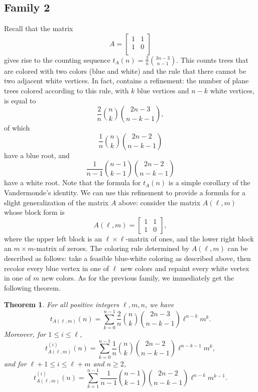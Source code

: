 \documentclass[12pt]{amsart}
\newtheorem{theorem}{Theorem}
\begin{document}
\subsection{Family 2}\label{sec:fam3}

Recall that the matrix
$$A = \begin{bmatrix}
    1 & 1 \\
    1 & 0 \\    
\end{bmatrix}$$
gives rise to the counting sequence $t_A(n) = \frac{2}{n} \binom{3n-3}{n-1}$. This counts trees that are colored with two colors (blue and white) and the rule that there cannot be two adjacent white vertices. In fact, \cite{KPT1986Fibonacci} contains a refinement: the number of plane trees colored according to this rule, with $k$ blue vertices and $n-k$ white vertices, is equal to
$$\frac{2}{n} \binom{n}{k} \binom{2n-3}{n-k-1},$$
of which
$$\frac{1}{n} \binom{n}{k} \binom{2n-2}{n-k-1}$$
have a blue root, and
$$\frac{1}{n-1} \binom{n-1}{k-1} \binom{2n-2}{n-k-1}$$
have a white root. Note that the formula for $t_A(n)$ is a simple corollary of the Vandermonde's identity. We can use this refinement to provide a formula for a slight generalization of the matrix $A$ above: consider
the matrix $A(\ell,m)$ whose block form is
\[
    A(\ell,m) =\left[\begin{array}{c|c}1&1\\\hline 1&0\end{array}\right],
\]
where the upper left block is an $\ell \times \ell$-matrix of ones, and the lower right block an $m \times m$-matrix of zeroes. The coloring rule determined by $A(\ell,m)$ can be described as follows: take a feasible blue-white coloring as described above, then recolor  every blue vertex in one of $\ell$ new colors and repaint every white vertex in one of $m$ new colors. As for the previous family, we immediately get the following theorem.

\begin{theorem}\label{thm:removesquare}
For all positive integers $\ell,m,n$, we have
    $$t_{A(\ell,m)}(n) = \sum_{k=0}^{n-1} \frac{2}{n} \binom{n}{k} \binom{2n-3}{n-k-1} \ell^{n-k} m^k.$$
Moreover, for $1 \leq i \leq \ell$,
    $$t_{A(\ell,m)}^{(i)}(n) = \sum_{k=0}^{n-1} \frac{1}{n} \binom{n}{k} \binom{2n-2}{n-k-1} \ell^{n-k-1} m^k,$$
and for $\ell + 1 \leq i \leq \ell+m$ and $n \geq 2$,
    $$t_{A(\ell,m)}^{(i)}(n) = \sum_{k=1}^{n-1} \frac{1}{n-1} \binom{n-1}{k-1} \binom{2n-2}{n-k-1} \ell^{n-k} m^{k-1}.$$
\end{theorem}
\end{document}
